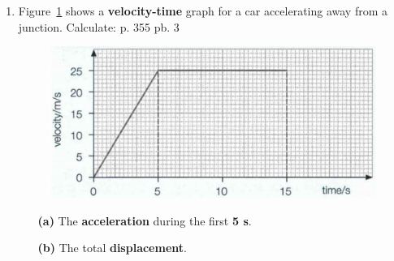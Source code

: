 \documentclass[A4,12pt]{article}
\begin{document}
\begin{enumerate}[label=\bfseries (\arabic*)]
\item Figure~\ref{xonana} shows a \textbf{velocity-time} graph for a car accelerating away from a junction. Calculate: \cite{CCEADA} p. 355 pb. 3
%
\begin{figure}[H]
    \centering
    \includegraphics[scale=0.8]{355-3.png}
    \caption{}
    \label{xonana}
\end{figure}
%
\begin{itemize}
    \item[\bf (a)] The \textbf{acceleration} during the first \textbf{5 s}.
    \item[\bf (b)] The total \textbf{displacement}.
\end{itemize}

































\end{enumerate}
\end{document}
